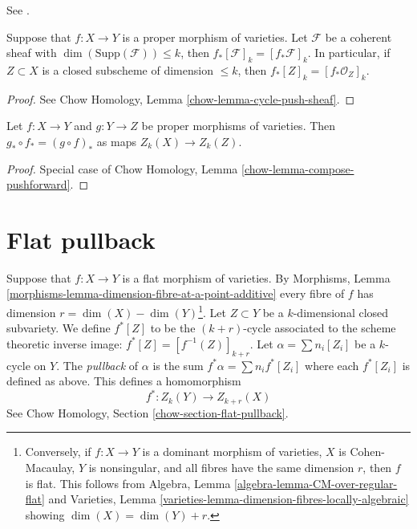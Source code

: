 \begin{lemma}
\label{lemma-push-coherent}
\begin{reference}
See \cite[Chapter V]{Serre_algebre_locale}.
\end{reference}
Suppose that $f : X \to Y$ is a proper morphism of varieties.
Let $\mathcal{F}$ be a coherent sheaf with
$\dim(\text{Supp}(\mathcal{F})) \leq k$, then
$f_*[\mathcal{F}]_k = [f_*\mathcal{F}]_k$. In particular, if
$Z \subset X$ is a closed subscheme of dimension $\leq k$, then
$f_*[Z]_k = [f_*\mathcal{O}_Z]_k$.
\end{lemma}

\begin{proof}
See Chow Homology, Lemma \ref{chow-lemma-cycle-push-sheaf}.
\end{proof}

\begin{lemma}
\label{lemma-compose-pushforward}
Let $f : X \to Y$ and $g : Y \to Z$ be proper morphisms of
varieties. Then $g_* \circ f_* = (g \circ f)_*$ as maps $Z_k(X) \to Z_k(Z)$.
\end{lemma}

\begin{proof}
Special case of Chow Homology, Lemma \ref{chow-lemma-compose-pushforward}.
\end{proof}



\section{Flat pullback}
\label{section-flat-pullback}

\noindent
Suppose that $f : X \to Y$ is a flat morphism of varieties.
By Morphisms, Lemma
\ref{morphisms-lemma-dimension-fibre-at-a-point-additive} 
every fibre of $f$ has dimension $r = \dim(X) - \dim(Y)$\footnote{Conversely,
if $f : X \to Y$ is a dominant morphism of varieties,
$X$ is Cohen-Macaulay, $Y$ is nonsingular, and all fibres have
the same dimension $r$, then $f$ is flat. This follows from
Algebra, Lemma \ref{algebra-lemma-CM-over-regular-flat} and
Varieties, Lemma \ref{varieties-lemma-dimension-fibres-locally-algebraic}
showing $\dim(X) = \dim(Y) + r$.}.
Let $Z \subset Y$ be a $k$-dimensional closed subvariety. We define
$f^*[Z]$ to be the $(k + r)$-cycle associated to the scheme theoretic
inverse image: $f^*[Z] = [f^{-1}(Z)]_{k + r}$. Let
$\alpha = \sum n_i [Z_i]$ be a $k$-cycle on $Y$. The {\it pullback} of
$\alpha$ is the sum $f^* \alpha = \sum n_i f^*[Z_i]$ where each $f^*[Z_i]$
is defined as above. This defines a homomorphism
$$
f^* : Z_k(Y) \longrightarrow Z_{k + r}(X)
$$
See Chow Homology, Section \ref{chow-section-flat-pullback}.

